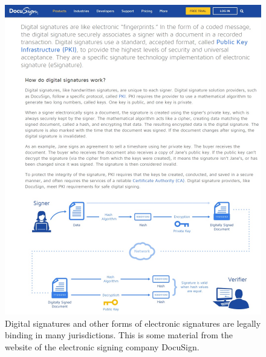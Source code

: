 \begin{figure}
\centering
\includegraphics[width=\textwidth, height=0.25\paperheight, keepaspectratio]{../figure/docusign.jpg}
\caption{Digital signatures and other forms of electronic signatures are
legally binding in many jurisdictions. This is some material from the
website of the electronic signing company DocuSign.}
\label{tmplabelfig}
\end{figure}

